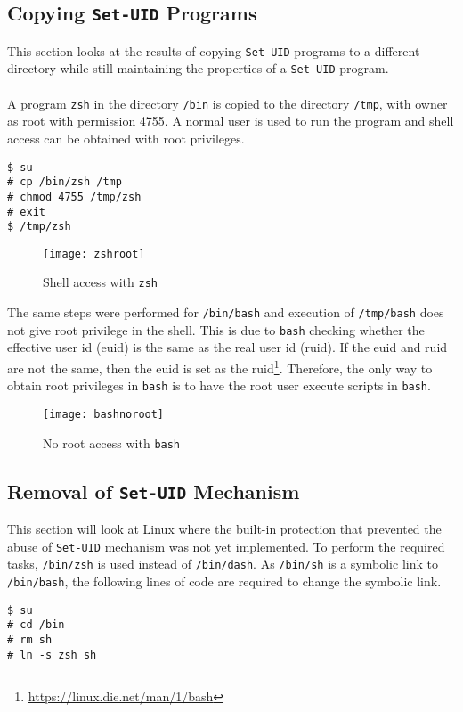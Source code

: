 \documentclass[a4paper,12pt]{article}
\newcommand{\setuid}{\texttt{Set-UID} }
\begin{document}
\subsection{Copying \texttt{Set-UID} Programs}
This section looks at the results of copying \texttt{Set-UID} programs to a different directory while still maintaining the properties of a \texttt{Set-UID} program. \\\\A program \texttt{zsh} in the directory \texttt{/bin} is copied to the directory \texttt{/tmp}, with owner as root with permission 4755. A normal user is used to run the program and shell access can be obtained with root privileges.
\begin{verbatim}
$ su
# cp /bin/zsh /tmp
# chmod 4755 /tmp/zsh
# exit
$ /tmp/zsh
\end{verbatim}
\begin{figure}[H]
	\centering
	\texttt{[image: zshroot]}
	\caption{Shell access with \texttt{zsh}}
	\label{fig:zshroot}
\end{figure}
The same steps were performed for \texttt{/bin/bash} and execution of \texttt{/tmp/bash} does not give root privilege in the shell. This is due to \texttt{bash} checking whether the effective user id (euid) is the same as the real user id (ruid). If the euid and ruid are not the same, then the euid is set as the ruid\footnote{\url{https://linux.die.net/man/1/bash}}. Therefore, the only way to obtain root privileges in \texttt{bash} is to have the root user execute scripts in \texttt{bash}.
\begin{figure}[H]
	\centering
	\texttt{[image: bashnoroot]}
	\caption{No root access with \texttt{bash}}
	\label{fig:bashnoroot}
\end{figure}
\subsection{Removal of \setuid Mechanism}
This section will look at Linux where the built-in protection that prevented the abuse of \setuid mechanism was not yet implemented. To perform the required tasks, \texttt{/bin/zsh} is used instead of \texttt{/bin/dash}. As \texttt{/bin/sh} is a symbolic link to \texttt{/bin/bash}, the following lines of code are required to change the symbolic link.
\begin{verbatim}
$ su 
# cd /bin
# rm sh
# ln -s zsh sh
\end{verbatim}
\end{document}
